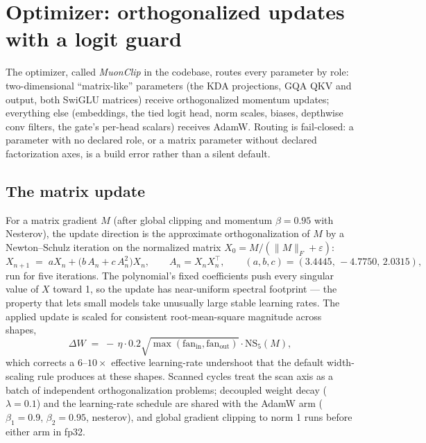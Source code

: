 \section{Optimizer: orthogonalized updates with a logit guard}
\label{sec:optimizer}

The optimizer, called \emph{MuonClip} in the codebase, routes every
parameter by role: two-dimensional ``matrix-like'' parameters (the KDA
projections, GQA QKV and output, both SwiGLU matrices) receive
orthogonalized momentum updates; everything else (embeddings, the tied
logit head, norm scales, biases, depthwise conv filters, the gate's
per-head scalars) receives AdamW. Routing is fail-closed: a parameter
with no declared role, or a matrix parameter without declared
factorization axes, is a build error rather than a silent default.

\subsection{The matrix update}

For a matrix gradient $M$ (after global clipping and momentum
$\beta = 0.95$ with Nesterov), the update direction is the approximate
orthogonalization of $M$ by a Newton--Schulz iteration on the normalized
matrix $X_0 = M / (\lVert M \rVert_F + \varepsilon)$:
\begin{equation}
X_{n+1} \;=\; a X_n + \big(b\, A_n + c\, A_n^2\big) X_n,
\qquad A_n = X_n X_n^{\top},
\qquad (a, b, c) = (3.4445,\, -4.7750,\, 2.0315),
\label{eq:ns}
\end{equation}
run for five iterations. The polynomial's fixed coefficients push every
singular value of $X$ toward 1, so the update has near-uniform spectral
footprint --- the property that lets small models take unusually large
stable learning rates. The applied update is scaled for consistent
root-mean-square magnitude across shapes,
\begin{equation}
\Delta W \;=\; -\,\eta \cdot 0.2 \sqrt{\max(\mathrm{fan_{in}},
\mathrm{fan_{out}})} \cdot \mathrm{NS}_5(M),
\label{eq:consistent-rms}
\end{equation}
which corrects a $6$--$10\times$ effective learning-rate undershoot that
the default width-scaling rule produces at these shapes. Scanned cycles
treat the scan axis as a batch of independent orthogonalization
problems; decoupled weight decay ($\lambda = 0.1$) and the learning-rate
schedule are shared with the AdamW arm
($\beta_1 = 0.9$, $\beta_2 = 0.95$, nesterov), and global gradient
clipping to norm 1 runs before either arm in fp32.

